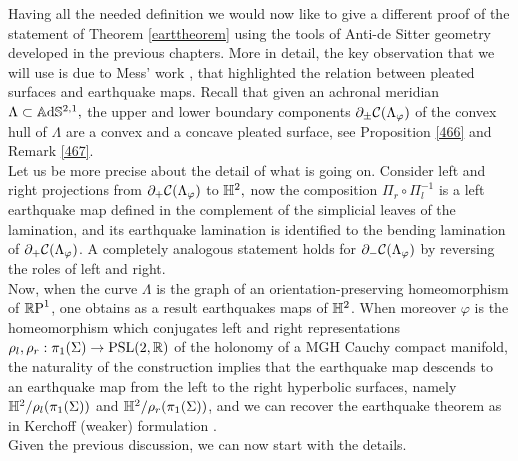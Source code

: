 Having all the needed definition we would now like to give a different proof of the statement of Theorem \ref{earttheorem} using the tools of Anti-de Sitter geometry developed in the previous chapters. More in detail, the key observation that we will use is due to Mess' work \cite{Mess}, that highlighted the relation between pleated surfaces and earthquake maps. Recall that given an achronal meridian $\Lambda\subset\A^{2,1},$ the upper and lower boundary components $\partial_{\pm}\CF$ of the convex hull of $\Lambda$ are a convex and a concave pleated surface, see Proposition \ref{466} and Remark \ref{467}.\\
Let us be more precise about the detail of what is going on. Consider left and right projections from $\partial_+\CF$ to $\H^2,$ now the composition $\Pi_r\circ\Pi_l^{-1}$  is a left earthquake map defined in the complement of the simplicial leaves of the lamination, and its earthquake lamination is identified to the bending lamination of $\partial_{+}\CF$. A completely analogous statement holds for $\partial_{-}\CF$ by reversing the roles of left and right.\\  
Now, when the curve $\Lambda$ is the graph of an orientation-preserving homeomorphism of $\S$, one obtains as a result earthquakes maps of $\H^2$. When moreover $\varphi$ is the homeomorphism which conjugates left and right representations $\rho_l,\rho_r:\pi_1(\Sigma)\to\PSL$ of the holonomy of a MGH Cauchy compact manifold, the naturality of the construction implies that the earthquake map descends to an earthquake map from the left to the right hyperbolic surfaces, namely $\H^2/\rho_l(\pi_1(\Sigma))$ and $\H^2/\rho_r(\pi_1(\Sigma))$, and we can recover the earthquake theorem as in Kerchoff (weaker) formulation \cite{kerckhoff1983nielsen}.\\
Given the previous discussion, we can now start with the details.


